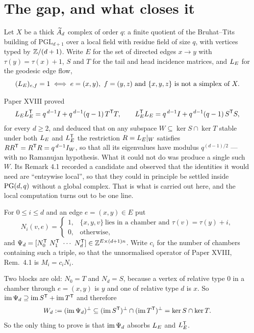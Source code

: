 \section{The gap, and what closes it}

Let $X$ be a thick $\widetilde A_{d}$ complex of order $q$: a finite quotient of the Bruhat--Tits
building of $\mathrm{PGL}_{d+1}$ over a local field with residue field of size $q$, with
vertices typed by $\mathbb{Z}/(d+1)$. Write $E$ for the set of directed edges $x\to y$ with
$\tau(y)=\tau(x)+1$, $S$ and $T$ for the tail and head incidence matrices, and $L_E$ for the
geodesic edge flow,
\[
  (\LE)_{e,f}=1 \iff e=(x,y),\ f=(y,z)\ \text{and}\ \{x,y,z\}\ \text{is not a simplex of }X .
\]

Paper XVIII proved
\begin{equation}\label{XX:eq:main}
  L_EL_E^{\mathsf{T}}=q^{\,d-1}I+q^{\,d-1}(q-1)\,T^{\mathsf{T}}T,\qquad
  L_E^{\mathsf{T}}L_E=q^{\,d-1}I+q^{\,d-1}(q-1)\,S^{\mathsf{T}}S ,
\end{equation}
for every $d\ge 2$, and deduced that on any subspace $W\subseteq\ker S\cap\ker T$ stable
under both $L_E$ and $L_E^{\mathsf{T}}$ the restriction $R=L_E|_W$ satisfies
$RR^{\mathsf{T}}=R^{\mathsf{T}}R=q^{\,d-1}I_W$, so that all its eigenvalues have modulus $q^{(d-1)/2}$ ---
with no Ramanujan hypothesis. What it could not do was produce a single such $W$. Its
Remark 4.1 recorded a candidate and observed that the identities it would need are
``entrywise local'', so that they could in principle be settled inside $\mathrm{PG}(d,q)$ without a
global complex. That is what is carried out here, and the local computation turns out to be
one line.

\begin{definition}\label{XX:def:M}
For $0\le i\le d$ and an edge $e=(x,y)\in E$ put
\[
  N_i(v,e)=
  \begin{cases}1, & \{x,y,v\}\ \text{lies in a chamber and }\tau(v)=\tau(y)+i,\\
               0, & \text{otherwise,}\end{cases}
\]
and $\Psi_d=[N_0^{\tp}\ N_1^{\tp}\ \cdots\ N_d^{\tp}]\in\Z^{E\times(d+1)n}$. Write $c_i$ for
the number of chambers containing such a triple, so that the unnormalised operator of
Paper XVIII, Rem.~4.1 is $M_i=c_iN_i$.
\end{definition}

Two blocks are old: $N_0=T$ and $N_d=S$, because a vertex of relative type $0$ in a chamber
through $e=(x,y)$ is $y$ and one of relative type $d$ is $x$. So
$\operatorname{im}\Psi_d\supseteq\operatorname{im} S^{\mathsf{T}}+\operatorname{im} T^{\mathsf{T}}$ and therefore
\begin{equation}\label{XX:eq:inside}
  W_d:=(\operatorname{im}\Psi_d)^{\perp}\subseteq(\operatorname{im} S^{\mathsf{T}})^{\perp}\cap(\operatorname{im} T^{\mathsf{T}})^{\perp}
  =\ker S\cap\ker T .
\end{equation}
So the only thing to prove is that $\operatorname{im}\Psi_d$ absorbs $L_E$ and $L_E^{\mathsf{T}}$.

